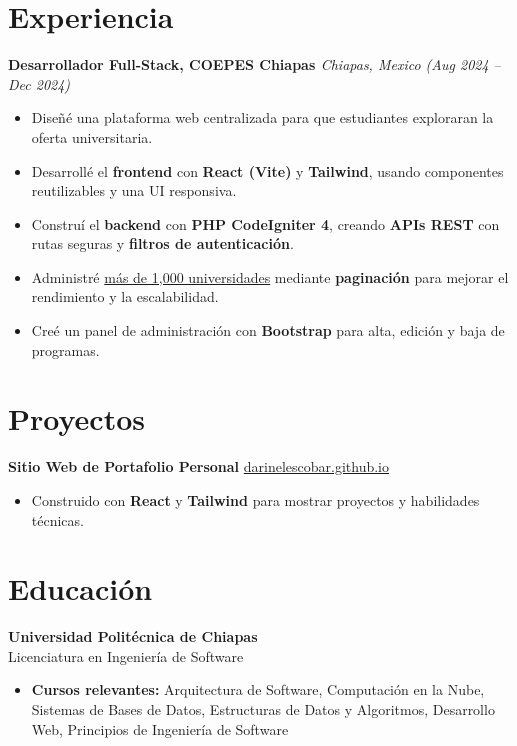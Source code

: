 \section{Experiencia}
\textbf{Desarrollador Full-Stack, COEPES Chiapas \href{https://plataforma.ieppd.chiapas.gob.mx/coepes/react/}{\faLink}} \hfill \textit{Chiapas, Mexico (Aug 2024 -- Dec 2024)}
\begin{itemize}
    \item Dise\~n\'e una plataforma web centralizada para que estudiantes exploraran la oferta universitaria.
    \item Desarroll\'e el \textbf{frontend} con \textbf{React (Vite)} y \textbf{Tailwind}, usando componentes reutilizables y una UI responsiva.
    \item Constru\'i el \textbf{backend} con \textbf{PHP CodeIgniter 4}, creando \textbf{APIs REST} con rutas seguras y \textbf{filtros de autenticaci\'on}.
    \item Administr\'e \underline{m\'as de 1,000 universidades} mediante \textbf{paginaci\'on} para mejorar el rendimiento y la escalabilidad.
    \item Cre\'e un panel de administraci\'on con \textbf{Bootstrap} para alta, edici\'on y baja de programas.
\end{itemize}

\section{Proyectos}
\textbf{Sitio Web de Portafolio Personal} \hfill {}\;\href{https://darinelescobar.github.io/}{darinelescobar.github.io}
\begin{itemize}
    \item Construido con \textbf{React} y \textbf{Tailwind} para mostrar proyectos y habilidades t\'ecnicas.
\end{itemize}

\section{Educaci\'on}
\textbf{Universidad Polit\'ecnica de Chiapas} \\
Licenciatura en Ingenier\'ia de Software
\begin{itemize}
    \item \textbf{Cursos relevantes:} Arquitectura de Software, Computaci\'on en la Nube, Sistemas de Bases de Datos, Estructuras de Datos y Algoritmos, Desarrollo Web, Principios de Ingenier\'ia de Software
\end{itemize}


